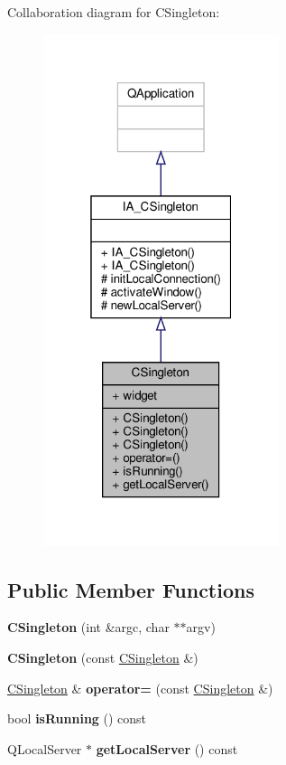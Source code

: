 Collaboration diagram for C\+Singleton\+:
\nopagebreak
\begin{figure}[H]
\begin{center}
\leavevmode
\includegraphics[width=196pt]{classCSingleton__coll__graph}
\end{center}
\end{figure}
\subsection*{Public Member Functions}
\begin{DoxyCompactItemize}
\item 
\mbox{\label{classCSingleton_ab589c4dcb50a499e8d1dec5e28f67daf}} 
{\bfseries C\+Singleton} (int \&argc, char $\ast$$\ast$argv)
\item 
\mbox{\label{classCSingleton_a3644cfb36a2b149dc972f7875b72b8de}} 
{\bfseries C\+Singleton} (const \hyperlink{classCSingleton}{C\+Singleton} \&)
\item 
\mbox{\label{classCSingleton_a77f9cc367af12d023f619e15c1cd9482}} 
\hyperlink{classCSingleton}{C\+Singleton} \& {\bfseries operator=} (const \hyperlink{classCSingleton}{C\+Singleton} \&)
\item 
\mbox{\label{classCSingleton_a8acf885adc746b72a9475921cea06749}} 
bool {\bfseries is\+Running} () const
\item 
\mbox{\label{classCSingleton_afed5bc3678f656efcbcfb6a8fd1a4c4a}} 
Q\+Local\+Server $\ast$ {\bfseries get\+Local\+Server} () const
\end{DoxyCompactItemize}
